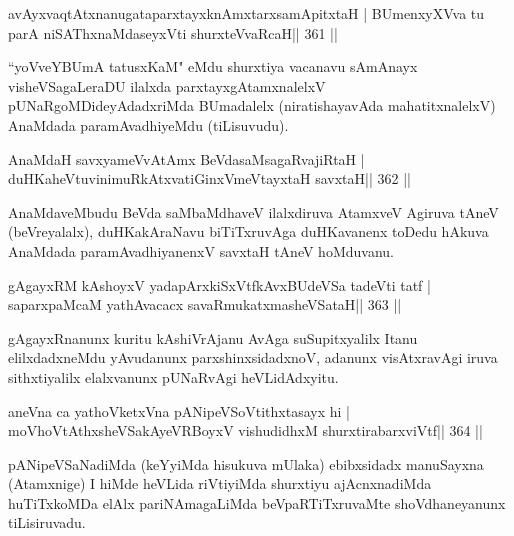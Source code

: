 \begin{shl}
avAyxvaqtAtxnanugataparxtayxknAmxtarxsamApitxtaH |
BUmenxyXVva tu parA niSAThx\s\s naMdaseyxVti shurxteVvaRcaH\hfill || 361 ||
\end{shl}

\begin{artha}
``yoVveYBUmA tatusxKaM" eMdu shurxtiya vacanavu sAmAnayx  visheVSagaLeraDU ilalxda parxtayxgAtamxnalelxV pUNaRgoMDideyAdadxriMda  BUmadalelx (niratishayavAda mahatitxnalelxV) AnaMdada paramAvadhiyeMdu (tiLisuvudu).
\end{artha}


\begin{shl}
AnaMdaH savxyameVvA\s\s tAmx BeVdasaMsagaRvajiRtaH |
duHKaheVtuvinimuRkAtxvatiGinxVmeVtayxtaH savxtaH\hfill || 362 ||
\end{shl}

\begin{artha}
AnaMdaveMbudu BeVda saMbaMdhaveV ilalxdiruva AtamxveV Agiruva tAneV (beVreyalalx), duHKakAraNavu biTiTxruvAga duHKavanenx toDedu hAkuva AnaMdada paramAvadhiyanenxV savxtaH tAneV hoMduvanu.
\end{artha}


\begin{shl}
gAgayxRM kAshoyxV yadapArxkiSxVtfkAvxBUdeVSa tadeVti tatf |
saparxpaMcaM yathAvacacx savaRmukatxmasheVSataH\hfill || 363 ||
\end{shl}

\begin{artha}
gAgayxRnanunx kuritu kAshiVrAjanu AvAga suSupitxyalilx Itanu elilxdadxneMdu yAvudanunx parxshinxsidadxnoV, adanunx visAtxravAgi iruva sithxtiyalilx elalxvanunx pUNaRvAgi heVLidAdxyitu.
\end{artha}


\begin{shl}
aneVna ca yathoVketxVna pANipeVSoVtithxtasayx hi |
moVhoVtAthxsheVSakAyeVRBoyxV vishudidhxM shurxtirabarxviVtf\hfill || 364 ||
\end{shl}

\begin{artha}
pANipeVSaNadiMda (keYyiMda hisukuva mUlaka) ebibxsidadx manuSayxna (Atamxnige) I hiMde heVLida riVtiyiMda shurxtiyu ajAcnxnadiMda huTiTxkoMDa elAlx pariNAmagaLiMda beVpaRTiTxruvaMte shoVdhaneyanunx tiLisiruvadu.
\end{artha}


